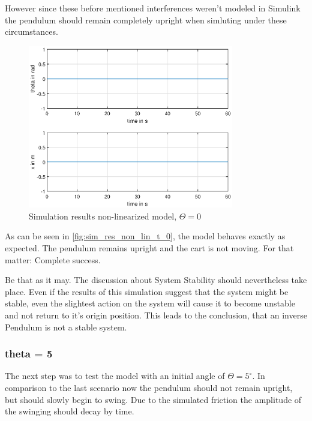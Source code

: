 However since these before mentioned interferences weren't modeled in Simulink the pendulum should remain completely upright when simluting under these circumstances. 
\begin{figure}[H]
    \centering
    \includegraphics[width=0.8\textwidth]{Lab_report/pics/plots/non_linearized_results_theta_0.eps}
    \caption{Simulation results non-linearized model, $\Theta=0$}
    \label{fig:sim_res_non_lin_t_0}
\end{figure}

As can be seen in \autoref{fig:sim_res_non_lin_t_0}, the model behaves exactly as expected. The pendulum remains upright and the cart is not moving. For that matter: Complete success.

Be that as it may. The discussion about System Stability should nevertheless take place. Even if the results of this simulation suggest that the system might be stable, even the slightest action on the system will cause it to become unstable and not return to it's origin position. This leads to the conclusion, that an inverse Pendulum is not a stable system. 

\subsubsection{theta = 5}
The next step was to test the model with an initial angle of $\Theta=5^\circ$. In comparison to the last scenario now the pendulum should not remain upright, but should slowly begin to swing. Due to the simulated friction the amplitude of the swinging should decay by time.

